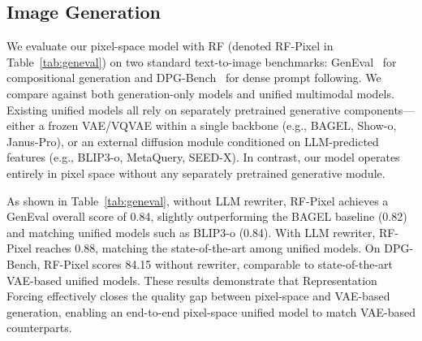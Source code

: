 \documentclass{llmxive}
\begin{document}
\subsection{Image Generation}
\label{sec:t2i}



We evaluate our pixel-space model with RF (denoted RF-Pixel in Table~\ref{tab:geneval}) on two standard text-to-image benchmarks: GenEval~\cite{geneval} for compositional generation and DPG-Bench~\cite{dpg} for dense prompt following. We compare against both generation-only models and unified multimodal models. Existing unified models all rely on separately pretrained generative components—either a frozen VAE/VQVAE within a single backbone (e.g., BAGEL, Show-o, Janus-Pro), or an external diffusion module conditioned on LLM-predicted features (e.g., BLIP3-o, MetaQuery, SEED-X). In contrast, our model operates entirely in pixel space without any separately pretrained generative module.


As shown in Table~\ref{tab:geneval}, without LLM rewriter, RF-Pixel achieves a GenEval overall score of 0.84, slightly outperforming the BAGEL baseline (0.82) and matching unified models such as BLIP3-o (0.84). With LLM rewriter, RF-Pixel reaches 0.88, matching the state-of-the-art among unified models. On DPG-Bench, RF-Pixel scores 84.15 without rewriter, comparable to state-of-the-art VAE-based unified models. These results demonstrate that Representation Forcing effectively closes the quality gap between pixel-space and VAE-based generation, enabling an end-to-end pixel-space unified model to match VAE-based counterparts.
\end{document}
